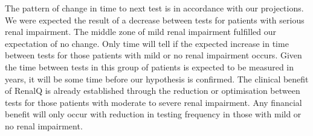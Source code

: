 \documentclass[11pt,a4paper]{article}
\begin{document}
The pattern of change in time to next test is in accordance with our projections. We were expected the result of a decrease between tests for patients with serious renal impairment. The middle zone of mild renal impairment fulfilled our expectation of no change. Only time will tell if the expected increase in time between tests for those patients with mild or no renal impairment occurs. Given the time between tests in this group of patients is expected to be measured in years, it will be some time before our hypothesis is confirmed. The clinical benefit of RenalQ is already established through the reduction or optimisation between tests for those patients with moderate to severe renal impairment. Any financial benefit will only occur with reduction in testing frequency in those with mild or no renal impairment.

\pagebreak



\end{document}
